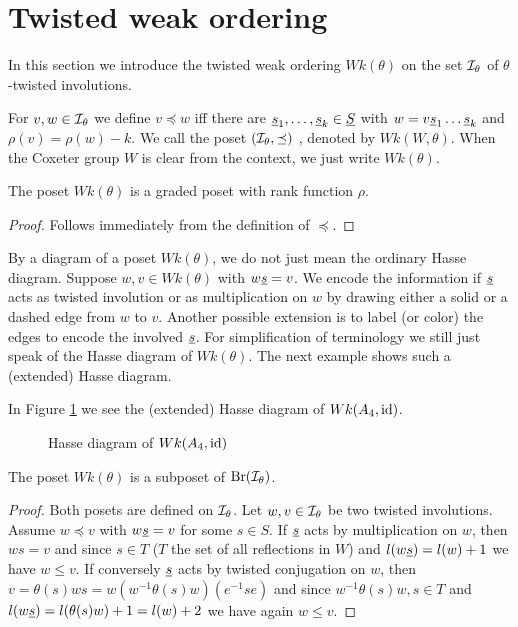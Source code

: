 \section{Twisted weak ordering}
\label{sec:twisted-involutions-twisted-weak-ordering}

In this section we introduce the twisted weak ordering $Wk(\theta)$ on the set $\mathcal{I}_{\theta}$ of $\theta$-twisted involutions.

\begin{defi}
	For $v,w \in \mathcal{I}_{\theta}$ we define $v \preceq w$ iff there are $\underline{s}_1, \ldots, \underline{s}_k \in \underline{S}$ with $w = v \underline{s}_1 \ldots \underline{s}_k$ and $\rho(v) = \rho(w) - k$. We call the poset $(\mathcal{I}_{\theta},\preceq)$ , denoted by $Wk(W, \theta)$. When the Coxeter group $W$ is clear from the context, we just write $Wk(\theta)$.
\end{defi}

\begin{prop}
	The poset $Wk(\theta)$ is a graded poset with rank function $\rho$.

	\begin{proof}
		Follows immediately from the definition of $\preceq$.
	\end{proof}
\end{prop}

By a diagram of a poset $Wk(\theta)$, we do not just mean the ordinary Hasse diagram. Suppose $w,v \in Wk(\theta)$ with $w \underline{s} = v$. We encode the information if $\underline{s}$ acts as twisted involution or as multiplication on $w$ by drawing either a solid or a dashed edge from $w$ to $v$. Another possible extension is to label (or color) the edges to encode the involved $\underline{s}$. For simplification of terminology we still just speak of the Hasse diagram of $Wk(\theta)$. The next example shows such a (extended) Hasse diagram.

\begin{exam}
	In Figure \ref{fig:a4} we see the (extended) Hasse diagram of $Wk(A_4, \operatorname{id})$.

	\begin{figure}[ht]
		\centering
		
		\caption{Hasse diagram of $Wk(A_4, \operatorname{id})$}
		\label{fig:a4}
	\end{figure}
\end{exam}

\begin{lemm}
	The poset $Wk(\theta)$ is a subposet of $\operatorname{Br}(\mathcal{I}_{\theta})$.

	\begin{proof}
		Both posets are defined on $\mathcal{I}_{\theta}$. Let $w,v \in \mathcal{I}_{\theta}$ be two twisted involutions. Assume $w \preceq v$ with $w \underline{s} = v$ for some $s \in S$. If $\underline{s}$ acts by multiplication on $w$, then $ws = v$ and since $s \in T$ ($T$ the set of all reflections in $W$) and $l(w \underline{s}) = l(w) + 1$ we have $w \leq v$. If conversely $\underline{s}$ acts by twisted conjugation on $w$, then $v = \theta(s)ws = w (w^{-1} \theta(s) w)(e^{-1}se)$ and since $w^{-1} \theta(s) w, s \in T$ and $l(w \underline{s}) = l(\theta(s)w) + 1 = l(w) + 2$ we have again $w \leq v$.
	\end{proof}
\end{lemm}

